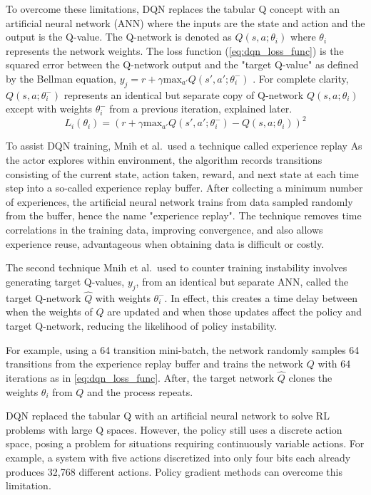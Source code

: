 To overcome these limitations, DQN replaces the tabular Q concept with an artificial neural network (ANN) where the inputs are the state and action and the output is the Q-value. The Q-network is denoted as $Q(s,a;\theta_i)$ where $\theta_i$ represents the network weights. The loss function (\ref{eq:dqn_loss_func}) is the squared error between the Q-network output and the "target Q-value" as defined by the Bellman equation, $y_j = r + \gamma \text{max}_{a'}Q(s', a';\theta^-_i)$  \cite{Mnih_2015}. For complete clarity, $Q(s,a;\theta^-_i)$ represents an identical but separate copy of Q-network $Q(s,a;\theta_i)$ except with weights $\theta^-_i$ from a previous iteration, explained later.
\begin{equation}
	\label{eq:dqn_loss_func}
L_i(\theta_i) = (r + \gamma \text{max}_{a'}Q(s', a';\theta^-_i)-Q(s,a;\theta_i))^2
\end{equation}

To assist DQN training, Mnih et al.\ used a technique called experience replay \cite{Mnih_2015} As the actor explores within environment, the algorithm records transitions consisting of the current state, action taken, reward, and next state at each time step into a so-called experience replay buffer. After collecting a minimum number of experiences, the artificial neural network trains from data sampled randomly from the buffer, hence the name "experience replay". The technique removes time correlations in the training data, improving convergence, and also allows experience reuse, advantageous when obtaining data is difficult or costly.

The second technique Mnih et al.\ used to counter training instability involves generating target Q-values, $y_j$, from an identical but separate ANN, called the target Q-network $\hat{Q}$ with weights $\theta^-_i$. In effect, this creates a time delay between when the weights of $Q$ are updated and when those updates affect the policy and target Q-network, reducing the likelihood of policy instability. 

For example, using a 64 transition mini-batch, the network randomly samples 64 transitions from the experience replay buffer and trains the network $Q$ with 64 iterations as in \ref{eq:dqn_loss_func}. After, the target network $\hat{Q}$ clones the weights $\theta_i$ from $Q$ and the process repeats.

DQN replaced the tabular Q with an artificial neural network to solve RL problems with large Q spaces. However, the policy still uses a discrete action space, posing a problem for situations requiring continuously variable actions. For example, a system with five actions discretized into only four bits each already produces 32,768 different actions. Policy gradient methods can overcome this limitation.

